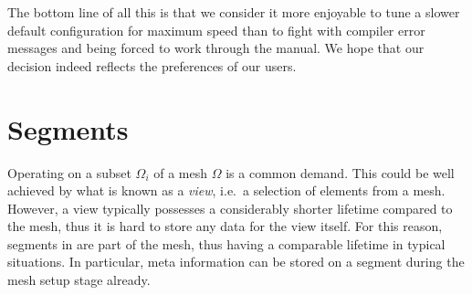  The bottom line of all this is that we consider it more enjoyable to tune a slower default configuration for maximum speed than to fight with compiler error messages and being forced to work through the manual. We hope that our decision indeed reflects the preferences of our users.


 \section{Segments}
 Operating on a subset $\Omega_i$ of a mesh $\Omega$ is a common demand. This could be well achieved by what is known as a \emph{view}, i.e.~a selection of elements from a mesh. However, a view typically possesses a considerably shorter lifetime compared to the mesh, thus it is hard to store any data for the view itself.
 For this reason, segments in {\ViennaGrid} are part of the mesh, thus having a comparable lifetime in typical situations.
 In particular, meta information can be stored on a segment during the mesh setup stage already.
